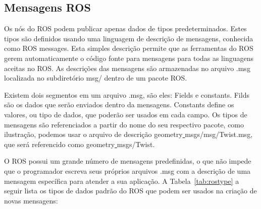 \subsection{Mensagens ROS}
Os nós do ROS podem publicar apenas dados de tipos predeterminados. Estes tipos são definidos usando uma linguagem de descrição de mensagens, conhecida como ROS messages. Esta simples descrição permite que as ferramentas do ROS gerem automaticamente o código fonte para mensagens para todas as linguagens aceitas no ROS\@. As descrições das mensagens são armazenadas no arquivo .msg localizada no subdiretório msg/ dentro de um pacote ROS\@.

Existem dois segmentos em um arquivo .msg, são eles: Fields e constants. Filds são os dados que serão enviados dentro da mensagens. Constants define os valores, ou tipo de dados, que poderão ser usados em cada campo. Os tipos de mensagens são referenciados a partir do nome do seu respectivo pacote, como ilustração, podemos usar o arquivo de descrição geometry\underline{ }msgs/msg/Twist.msg, que será referencido como geometry\underline{ }msgs/Twist. 

O ROS possui um grande número de mensagens predefinidas, o que não impede que o programador escreva seus próprios arquivos .msg com a descrição de uma mensagem específica para atender a sua aplicação. A Tabela~\ref{tab:rostype} a seguir lista os tipos de dados padrão do ROS que podem ser usados na criação de novas mensagens: 


